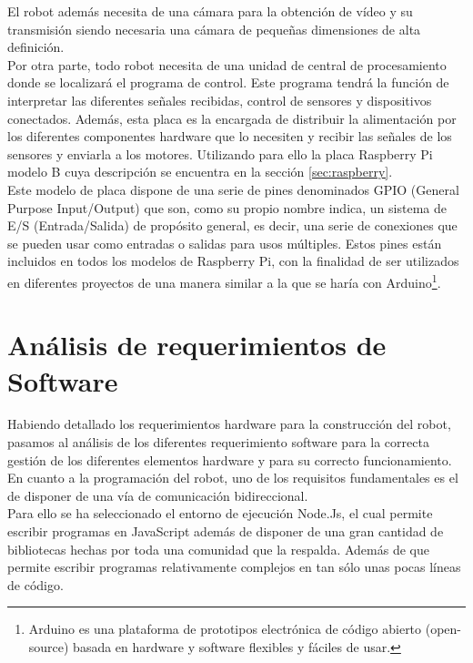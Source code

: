 El robot además necesita de una cámara para la obtención de vídeo y su transmisión siendo necesaria una cámara de pequeñas dimensiones de alta definición.\\

Por otra parte, todo robot necesita de una unidad de central de procesamiento donde se localizará el programa de control. Este programa tendrá la función de interpretar las diferentes señales recibidas,
control de sensores y dispositivos conectados. Además, esta placa es la encargada de distribuir la alimentación por los diferentes componentes hardware que lo necesiten y recibir las señales de
los sensores y enviarla a los motores. Utilizando para ello la placa Raspberry Pi modelo B cuya descripción se encuentra en la sección \ref{sec:raspberry}.\\

Este modelo de placa dispone de  una serie de pines denominados GPIO (General Purpose Input/Output) que son, como su propio nombre indica, un sistema de E/S (Entrada/Salida) de propósito general,
es decir, una serie de conexiones que se pueden usar como entradas o salidas para usos múltiples. Estos pines están incluidos en todos los modelos de Raspberry Pi, con la
finalidad de ser utilizados en diferentes proyectos de una manera similar a la que se haría con Arduino\footnote{Arduino es una plataforma de prototipos electrónica de código abierto (open-source) 
basada en hardware y software flexibles y fáciles de usar.}.

\section{Análisis de requerimientos de Software}

Habiendo detallado los requerimientos hardware para la construcción del robot, pasamos al análisis de los diferentes requerimiento software para la correcta
gestión de los diferentes elementos hardware y para su correcto funcionamiento.\\

En cuanto a la programación del robot, uno de los requisitos fundamentales es el de disponer de una vía de comunicación bidireccional.\\

Para ello se ha seleccionado el entorno de ejecución Node.Js, el cual permite escribir programas en JavaScript además de disponer de una gran cantidad de bibliotecas hechas por toda una comunidad que la respalda.
Además de que permite escribir programas relativamente complejos en tan sólo unas pocas líneas de código.\\

